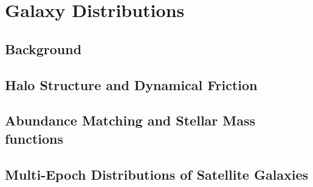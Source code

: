 
\chapter{Galaxy Distributions} %
\label{Chapter:GalDist}

\section{Background}
\section{Halo Structure and Dynamical Friction}
\section{Abundance Matching and Stellar Mass functions}
\section{Multi-Epoch Distributions of Satellite Galaxies}
